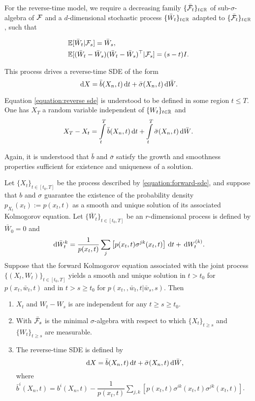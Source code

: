 For the reverse-time model, we require a decreasing family $\{\bar{\mathcal{F}}_t\}_{t\in\mathbb{R}}$ of sub-$\sigma$-algebra of $\mathcal{F}$ and a $d$-dimensional stochastic process $\{\bar{W}_t\}_{t\in\mathbb{R}}$ adapted to $\{\bar{\mathcal{F}}_t\}_{t\in\mathbb{R}}$, such that

\begin{equation}
  \label{eqs:reverse-sde-condition}
  \begin{aligned}
     & \mathbb{E}[\bar{W}_t | \mathcal{F}_s] = \bar{W}_s,                                        \\
     & \mathbb{E}[(\bar{W}_t - \bar{W}_s)(\bar{W}_t - \bar{W}_s)^\top | \mathcal{F}_s] = (s-t)I.
  \end{aligned}
\end{equation}

This process drives a reverse-time SDE of the form
\begin{equation}
  \label{equation:reverse sde}
  \,\mathrm{d} X=\bar{b}(X_n,t)\,\mathrm{d} t+\bar{\sigma}(X_n,t)\,\mathrm{d} \bar{W}.
\end{equation}

Equation \ref{equation:reverse sde} is understood to be defined in some region $t\le T$. One has $X_T$ a random variable independent of $\{W_t\}_{t\in\mathbb{R}}$ and
$$X_T - X_t = \int\limits_t^T \bar{b}(X_n,t)\,\mathrm{d} t + \int\limits_t^T\bar{\sigma}(X_n,t)\,\mathrm{d} \bar{W}.$$

Again, it is understood that $\bar{b}$ and $\bar{\sigma}$ satisfy the growth and smoothness properties sufficient for existence and uniqueness of a solution.

\begin{theorem}
  \label{theorem:reverse-time-sde}
  Let $\{X_t\}_{t \in [t_0,T]}$ be the process described by \ref{equation:forward-sde}, and suppose that $b$ and $\sigma$ guarantee the existence of the probability density $p_{X_t}(x_t) := p(x_t,t)$ as a smooth and unique solution of its associated Kolmogorov equation. Let $\{\bar{W}_t\}_{t \in [t_0,T]}$ be an $r$-dimensional process is defined by $\bar{W}_{0}=0$ and
  \begin{equation}
    \label{equation:bar-w}
    \,\mathrm{d}\bar{W}_t^{k} = \dfrac{1}{p(x_t,t)}\sum\limits_{j} \left[p(x_t,t)\sigma^{jk}(x_t,t)\right]\,\mathrm{d} t + \,\mathrm{d} W_t^{(k)}.
  \end{equation}
  Suppose that the forward Kolmogorov equation associated with the joint process $\{(X_t, W_t)\}_{t \in [t_0,T]}$ yields a smooth and unique solution in $t>t_0$ for $p(x_t,\bar{w}_t,t)$ and in $t > s\ge t_0$ for $p(x_t,, \bar{w}_t, t |\bar{w}_s, s)$. Then
  \begin{enumerate}[label=(\arabic*)]
    \item $X_t$ and $W_t-W_s$ is are independent for any $t\ge s\ge t_0$.
    \item With $\bar{\mathcal{F}}_s$ is the minimal $\sigma$-algebra with respect to which $\{X_t\}_{t\ge s}$ and $\{W_t\}_{t\ge s}$ are measurable.
    \item The reverse-time SDE is defined by
          $$\,\mathrm{d} X=\bar{b}(X_n,t)\,\mathrm{d} t+\bar{\sigma}(X_n,t)\,\mathrm{d} \bar{W},$$
          where $\bar{b}^i(X_n,t) = b^i(X_n,t) - \dfrac{1}{p(x_t,t)}\sum\limits_{j,k} \left[p(x_t,t)\sigma^{ik}(x_t,t)\sigma^{jk}(x_t,t)\right]$.
  \end{enumerate}
\end{theorem}

